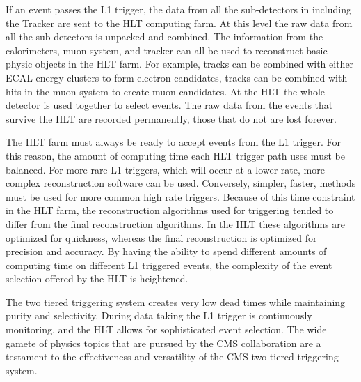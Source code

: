     If an event passes the L1 trigger, the data from all the sub-detectors in
      including the Tracker are sent to the HLT computing farm. 
    At this level the raw data from all the sub-detectors is unpacked and 
      combined.
    The information from the calorimeters, muon system, and tracker can all 
      be used to reconstruct basic physic objects in the HLT farm. 
    For example, tracks can be combined with either ECAL energy clusters to 
      form electron candidates, tracks can be combined with hits in the muon
      system to create muon candidates.
    At the HLT the whole detector is used together to select events.
    The raw data from the events that survive the HLT are recorded permanently,
      those that do not are lost forever. 

    The HLT farm must always be ready to accept events from the L1 trigger.
    For this reason, the amount of computing time each HLT trigger path uses
      must be balanced.
    For more rare L1 triggers, which will occur at a lower rate, more 
      complex reconstruction software can be used.
    Conversely, simpler, faster, methods must be used for more common high
      rate triggers. 
    Because of this time constraint in the HLT farm, the reconstruction 
      algorithms used for triggering tended to differ from the final 
      reconstruction algorithms.
    In the HLT these algorithms are optimized for quickness, whereas the final 
      reconstruction is optimized for precision and accuracy.
    By having the ability to spend different amounts of computing time on 
      different L1 triggered events, the complexity of the event selection 
      offered by the HLT is heightened. 

    The two tiered triggering system creates very low dead times while 
      maintaining purity and selectivity.
    During data taking the L1 trigger is continuously monitoring, and the HLT
      allows for sophisticated event selection.
    The wide gamete of physics topics that are pursued by the CMS collaboration
      are a testament to the effectiveness and versatility of the CMS two 
      tiered triggering system. 
